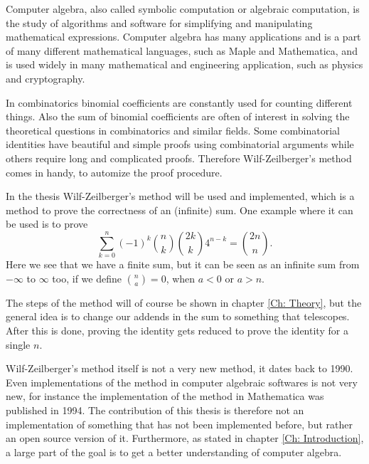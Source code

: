 Computer algebra, also called symbolic computation or algebraic computation, is the study of algorithms and software for simplifying and manipulating mathematical expressions. Computer algebra has many applications and is a part of many different mathematical languages, such as Maple and Mathematica, and is used widely in many mathematical and engineering application, such as physics and cryptography. 

In combinatorics binomial coefficients are constantly used for counting different things. Also the sum of binomial coefficients are often of interest in solving the theoretical questions in combinatorics and similar fields. Some combinatorial identities have beautiful and simple proofs using combinatorial arguments while others require long and complicated proofs. Therefore Wilf-Zeilberger's method comes in handy, to automize the proof procedure.

In the thesis Wilf-Zeilberger's method will be used and implemented, which is a method to prove the correctness of an (infinite) sum. One example where it can be used is to prove
\begin{equation}
  \sum_{k=0}^n (-1)^k\binom{n}{k}\binom{2k}{k}4^{n-k}=\binom{2n}{n}.
\end{equation}
Here we see that we have a finite sum, but it can be seen as an infinite sum from $-\infty$ to $\infty$ too, if we define $\binom{n}{a}=0$, when $a<0$ or $a>n$.

The steps of the method will of course be shown in chapter \ref{Ch: Theory}, but the general idea is to change our addends in the sum to something that telescopes. After this is done, proving the identity gets reduced to prove the identity for a single $n$.

Wilf-Zeilberger's method itself is not a very new method, it dates back to 1990.  Even implementations of the method in computer algebraic softwares is not very new, for instance the implementation of the method in Mathematica was published in 1994.  The contribution of this thesis is therefore not an implementation of something that has not been implemented before, but rather an open source version of it. Furthermore, as stated in chapter \ref{Ch: Introduction}, a large part of the goal is to get a better understanding of computer algebra.
